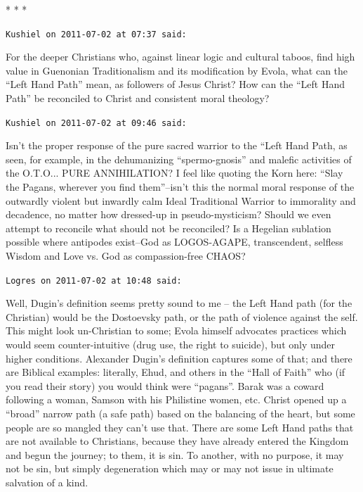 
\begin{center}* * *\end{center}

\begin{footnotesize}
\begin{sffamily}
\texttt{Kushiel on 2011-07-02 at 07:37 said:}

For the deeper Christians who, against linear logic and cultural taboos, find high value in Guenonian Traditionalism and its modification by Evola, what can the ``Left Hand Path'' mean, as followers of Jesus Christ? How can the ``Left Hand Path'' be reconciled to Christ and consistent moral theology?

\hfill

\texttt{Kushiel on 2011-07-02 at 09:46 said:}

Isn't the proper response of the pure sacred warrior to the ``Left Hand Path, as seen, for example, in the dehumanizing ``spermo-gnosis'' and malefic activities of the O.T.O... PURE ANNIHILATION? I feel like quoting the Korn here: ``Slay the Pagans, wherever you find them''--isn't this the normal moral response of the outwardly violent but inwardly calm Ideal Traditional Warrior to immorality and decadence, no matter how dressed-up in pseudo-mysticism? Should we even attempt to reconcile what should not be reconciled? Is a Hegelian sublation possible where antipodes exist--God as LOGOS-AGAPE, transcendent, selfless Wisdom and Love vs. God as compassion-free CHAOS?

\hfill

\texttt{Logres on 2011-07-02 at 10:48 said:}

Well, Dugin's definition seems pretty sound to me -- the Left Hand path (for the Christian) would be the Dostoevsky path, or the path of violence against the self. This might look un-Christian to some; Evola himself advocates practices which would seem counter-intuitive (drug use, the right to suicide), but only under higher conditions. Alexander Dugin's definition captures some of that; and there are Biblical examples: literally, Ehud, and others in the ``Hall of Faith'' who (if you read their story) you would think were ``pagans''. Barak was a coward following a woman, Samson with his Philistine women, etc. Christ opened up a ``broad'' narrow path (a safe path) based on the balancing of the heart, but some people are so mangled they can't use that. There are some Left Hand paths that are not available to Christians, because they have already entered the Kingdom and begun the journey; to them, it is sin. To another, with no purpose, it may not be sin, but simply degeneration which may or may not issue in ultimate salvation of a kind.


\end{sffamily}
\end{footnotesize}
